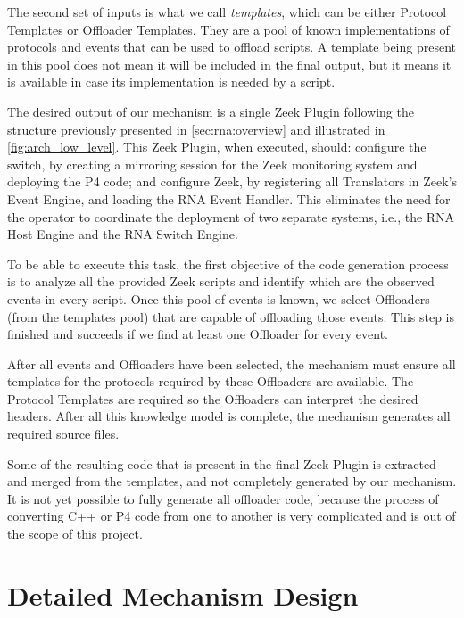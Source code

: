 The second set of inputs is what we call \textit{templates}, which can be either  Protocol Templates or Offloader Templates. They are a pool of known implementations of protocols and events that can be used to offload scripts. A template being present in this pool does not mean it will be included in the final output, but it means it is available in case its implementation is needed by a script.

The desired output of our mechanism is a single Zeek Plugin following the structure previously presented in \autoref{sec:rna:overview} and illustrated in \autoref{fig:arch_low_level}. This Zeek Plugin, when executed, should: configure the switch, by creating a mirroring session for the Zeek monitoring system and deploying the P4 code; and configure Zeek, by registering all Translators in Zeek's Event Engine, and loading the RNA Event Handler. This eliminates the need for the operator to coordinate the deployment of two separate systems, i.e., the RNA Host Engine and the RNA Switch Engine.

To be able to execute this task, the first objective of the code generation process is to analyze all the provided Zeek scripts and identify which are the observed events in every script. Once this pool of events is known, we select Offloaders (from the templates pool) that are capable of offloading those events. This step is finished and succeeds if we find at least one Offloader for every event.

After all events and Offloaders have been selected, the mechanism must ensure all templates for the protocols required by these Offloaders are available. The Protocol Templates are required so the Offloaders can interpret the desired headers. After all this knowledge model is complete, the mechanism generates all required source files.

Some of the resulting code that is present in the final Zeek Plugin is extracted and merged from the templates, and not completely generated by our mechanism. It is not yet possible to fully generate all offloader code, because the process of converting C++ or P4 code from one to another is very complicated and is out of the scope of this project.



\section{Detailed Mechanism Design}
\label{sec:code_gen:detailed}

